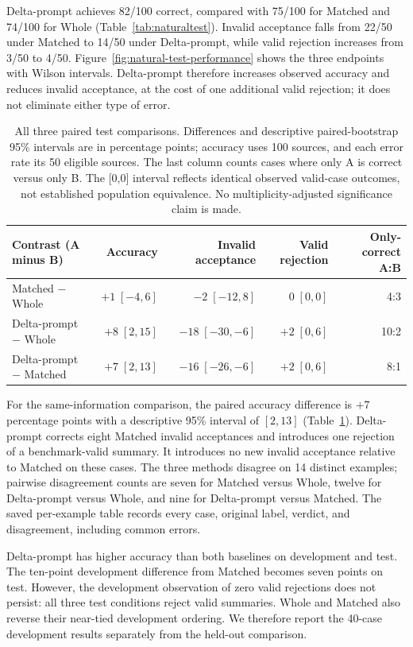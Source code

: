 \documentclass[10pt,letterpaper,twocolumn]{article}
\begin{document}
Delta-prompt achieves 82/100 correct, compared with 75/100 for Matched and 74/100 for Whole (Table~\ref{tab:naturaltest}). Invalid acceptance falls from 22/50 under Matched to 14/50 under Delta-prompt, while valid rejection increases from 3/50 to 4/50. Figure~\ref{fig:natural-test-performance} shows the three endpoints with Wilson intervals. Delta-prompt therefore increases observed accuracy and reduces invalid acceptance, at the cost of one additional valid rejection; it does not eliminate either type of error.

\begin{table}[t]
\centering\small
\setlength{\tabcolsep}{5pt}
\begin{tabular}{@{}lrrrr@{}}
\toprule
Contrast (A minus B) & Accuracy & Invalid acceptance & Valid rejection & Only-correct A:B\\
\midrule
Matched $-$ Whole & $+1\;[-4,6]$ & $-2\;[-12,8]$ & $0\;[0,0]$ & 4:3\\
Delta-prompt $-$ Whole & $+8\;[2,15]$ & $-18\;[-30,-6]$ & $+2\;[0,6]$ & 10:2\\
Delta-prompt $-$ Matched & $+7\;[2,13]$ & $-16\;[-26,-6]$ & $+2\;[0,6]$ & 8:1\\
\bottomrule
\end{tabular}
\caption{All three paired test comparisons. Differences and descriptive paired-bootstrap 95\% intervals are in percentage points; accuracy uses 100 sources, and each error rate its 50 eligible sources. The last column counts cases where only A is correct versus only B. The [0,0] interval reflects identical observed valid-case outcomes, not established population equivalence. No multiplicity-adjusted significance claim is made.}
\label{tab:naturalpairs}
\end{table}

For the same-information comparison, the paired accuracy difference is $+7$ percentage points with a descriptive 95\% interval of $[2,13]$ (Table~\ref{tab:naturalpairs}). Delta-prompt corrects eight Matched invalid acceptances and introduces one rejection of a benchmark-valid summary. It introduces no new invalid acceptance relative to Matched on these cases. The three methods disagree on 14 distinct examples; pairwise disagreement counts are seven for Matched versus Whole, twelve for Delta-prompt versus Whole, and nine for Delta-prompt versus Matched. The saved per-example table records every case, original label, verdict, and disagreement, including common errors.

Delta-prompt has higher accuracy than both baselines on development and test. The ten-point development difference from Matched becomes seven points on test. However, the development observation of zero valid rejections does not persist: all three test conditions reject valid summaries. Whole and Matched also reverse their near-tied development ordering. We therefore report the 40-case development results separately from the held-out comparison.
\end{document}
